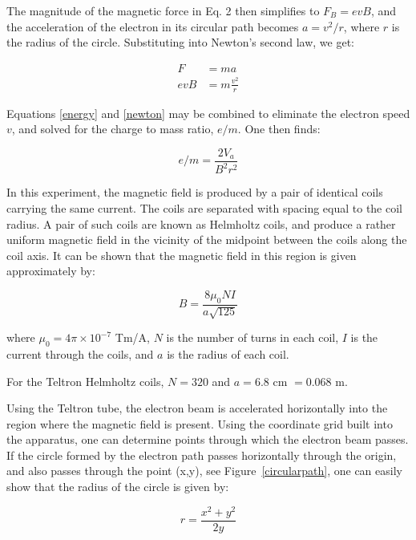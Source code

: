 The magnitude of the magnetic force in Eq. 2 then simplifies to
$F_{B }= evB$, and the acceleration of the electron in its
circular path becomes $a = v^{2}/r$, where $r$ is the radius
of the circle. Substituting into Newton's second law,
we get:


\begin{align}
\label{newton}
F &= ma \nonumber \\
evB &= m\frac{v^{2}}{r}
\end{align}

Equations \ref{energy} and \ref{newton} may be combined to eliminate the electron speed $v$, and
solved for the charge to mass ratio, $e/m$. One then finds:

\begin{equation}
\label{eom}
\boxed{ e/m = \frac{2V_a}{B^2r^2} }
\end{equation}

In this experiment, the magnetic field is produced by a pair of
identical coils carrying the same current. The coils are separated with
spacing equal to the coil radius. A pair of such coils are known as
Helmholtz coils, and produce a rather uniform magnetic field in the
vicinity of the midpoint between the coils along the coil axis. It can
be shown that the magnetic field in this region is given approximately
by:

\begin{equation}
\label{helmholtz}
\boxed{ B=\frac{8 \mu_0 N I}{a \sqrt{125}} }
\end{equation}

where $\mu_0 = 4\pi \times 10^{-7} $ Tm/A, $N$ is the number of turns in each coil, $I$ is the current
through the coils, and $a$ is the radius of each coil.

For the Teltron Helmholtz coils, $N = 320$ and $a = 6.8$ cm $= 0.068$ m.

Using the Teltron tube, the electron beam is accelerated horizontally
into the region where the magnetic field is present. Using the
coordinate grid built into the apparatus, one can determine points
through which the electron beam passes. If the circle formed by the
electron path passes horizontally through the origin, and also passes
through the point (x,y), see Figure~\ref{circularpath}, one can easily show
that the radius of the circle is given by:

\begin{equation}
\label{circle}
\boxed{ r=\frac{x^2+y^2}{2y} }
\end{equation}

